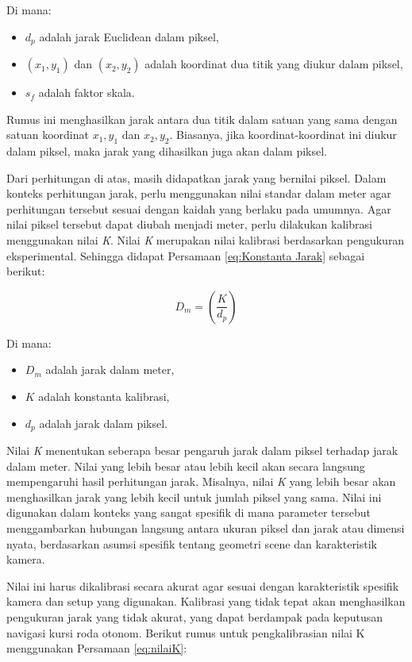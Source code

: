 Di mana:
\begin{itemize}
\item $d_p$ adalah jarak Euclidean dalam piksel,
\item $(x_1, y_1)$ dan $(x_2, y_2)$ adalah koordinat dua titik yang diukur dalam piksel,
\item $s_f$ adalah faktor skala.
\end{itemize}

Rumus ini menghasilkan jarak antara dua titik dalam satuan yang sama dengan satuan koordinat $x_1, y_1$ dan $x_2, y_2$. Biasanya, jika koordinat-koordinat ini diukur dalam piksel, maka jarak yang dihasilkan juga akan dalam piksel.

Dari perhitungan di atas, masih didapatkan jarak yang bernilai piksel. Dalam konteks perhitungan jarak, perlu menggunakan nilai standar dalam meter agar perhitungan tersebut sesuai dengan kaidah yang berlaku pada umumnya. Agar nilai piksel tersebut dapat diubah menjadi meter, perlu dilakukan kalibrasi menggunakan nilai \emph{K}. Nilai \emph{K} merupakan nilai kalibrasi berdasarkan pengukuran eksperimental. Sehingga didapat Persamaan \ref{eq:Konstanta Jarak} sebagai berikut:

\begin{equation}
\label{eq:Konstanta Jarak}
D_m = \left(\frac{K}{{d_p}}\right)
\end{equation}

Di mana:
\begin{itemize}
\item $D_m$ adalah jarak dalam meter,
\item $K$ adalah konstanta kalibrasi,
\item $d_p$ adalah jarak dalam piksel.
\end{itemize}

Nilai \emph{K} menentukan seberapa besar pengaruh jarak dalam piksel terhadap jarak dalam meter. Nilai yang lebih besar atau lebih kecil akan secara langsung mempengaruhi hasil perhitungan jarak. Misalnya, nilai \emph{K} yang lebih besar akan menghasilkan jarak yang lebih kecil untuk jumlah piksel yang sama. Nilai ini digunakan dalam konteks yang sangat spesifik di mana parameter tersebut menggambarkan hubungan langsung antara ukuran piksel dan jarak atau dimensi nyata, berdasarkan asumsi spesifik tentang geometri scene dan karakteristik kamera.

Nilai ini harus dikalibrasi secara akurat agar sesuai dengan karakteristik spesifik kamera dan setup yang digunakan. Kalibrasi yang tidak tepat akan menghasilkan pengukuran jarak yang tidak akurat, yang dapat berdampak pada keputusan navigasi kursi roda otonom. Berikut rumus untuk pengkalibrasian nilai K menggunakan Persamaan \ref{eq:nilaiK}:

